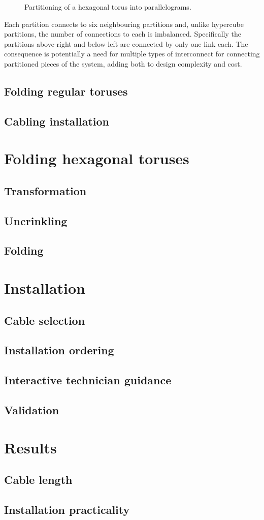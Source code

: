 			\begin{figure}
				\center
				
				
				\caption{Partitioning of a hexagonal torus into parallelograms.}
				\label{fig:parallelogramPartitioning}
			\end{figure}
			
			Each partition connects to six neighbouring partitions and, unlike
			hypercube partitions, the number of connections to each is imbalanced.
			Specifically the partitions above-right and below-left are connected by
			only one link each. The consequence is potentially a need for multiple
			types of interconnect for connecting partitioned pieces of the system,
			adding both to design complexity and cost.
		
		\subsection{Folding regular toruses}
			
			
		
		\subsection{Cabling installation}
	
	\section{Folding hexagonal toruses}
		\subsection{Transformation}
		\subsection{Uncrinkling}
		\subsection{Folding}
	\section{Installation}
		\subsection{Cable selection}
		\subsection{Installation ordering}
		\subsection{Interactive technician guidance}
		\subsection{Validation}
	\section{Results}
		\subsection{Cable length}
		\subsection{Installation practicality}
